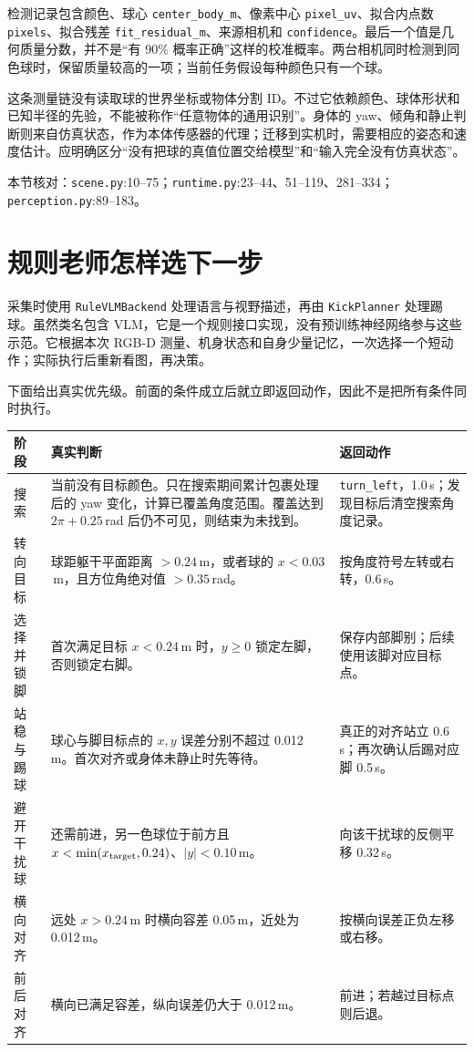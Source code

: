 检测记录包含颜色、球心 \texttt{center\_body\_m}、像素中心 \texttt{pixel\_uv}、拟合内点数 \texttt{pixels}、拟合残差 \texttt{fit\_residual\_m}、来源相机和 \texttt{confidence}。最后一个值是几何质量分数，并不是“有 90\% 概率正确”这样的校准概率。两台相机同时检测到同色球时，保留质量较高的一项；当前任务假设每种颜色只有一个球。

这条测量链没有读取球的世界坐标或物体分割 ID。不过它依赖颜色、球体形状和已知半径的先验，不能被称作“任意物体的通用识别”。身体的 yaw、倾角和静止判断则来自仿真状态，作为本体传感器的代理；迁移到实机时，需要相应的姿态和速度估计。应明确区分“没有把球的真值位置交给模型”和“输入完全没有仿真状态”。

本节核对：\texttt{scene.py}:10--75；\texttt{runtime.py}:23--44、51--119、281--334；\texttt{perception.py}:89--183。

\section{规则老师怎样选下一步}

采集时使用 \texttt{RuleVLMBackend} 处理语言与视野描述，再由 \texttt{KickPlanner} 处理踢球。虽然类名包含 VLM，它是一个规则接口实现，没有预训练神经网络参与这些示范。它根据本次 RGB-D 测量、机身状态和自身少量记忆，一次选择一个短动作；实际执行后重新看图，再决策。

下面给出真实优先级。前面的条件成立后就立即返回动作，因此不是把所有条件同时执行。

\begin{longtable}{P{2.2cm}P{8.0cm}P{4.4cm}}
\hline
阶段 & 真实判断 & 返回动作\\
\hline
\endhead
搜索 & 当前没有目标颜色。只在搜索期间累计包裹处理后的 yaw 变化，计算已覆盖角度范围。覆盖达到 $2\pi+0.25$\,rad 后仍不可见，则结束为未找到。 & \texttt{turn\_left}，1.0\,s；发现目标后清空搜索角度记录。\\
转向目标 & 球距躯干平面距离 $>0.24$\,m，或者球的 $x<0.03$\,m，且方位角绝对值 $>0.35$\,rad。 & 按角度符号左转或右转，0.6\,s。\\
选择并锁脚 & 首次满足目标 $x<0.24$\,m 时，$y\geq0$ 锁定左脚，否则锁定右脚。 & 保存内部脚别；后续使用该脚对应目标点。\\
站稳与踢球 & 球心与脚目标点的 $x,y$ 误差分别不超过 0.012\,m。首次对齐或身体未静止时先等待。 & 真正的对齐站立 0.6\,s；再次确认后踢对应脚 0.5\,s。\\
避开干扰球 & 还需前进，另一色球位于前方且 $x<\min(x_{\rm target},0.24)$、$|y|<0.10$\,m。 & 向该干扰球的反侧平移 0.32\,s。\\
横向对齐 & 远处 $x>0.24$\,m 时横向容差 0.05\,m，近处为 0.012\,m。 & 按横向误差正负左移或右移。\\
前后对齐 & 横向已满足容差，纵向误差仍大于 0.012\,m。 & 前进；若越过目标点则后退。\\
\hline
\end{longtable}


